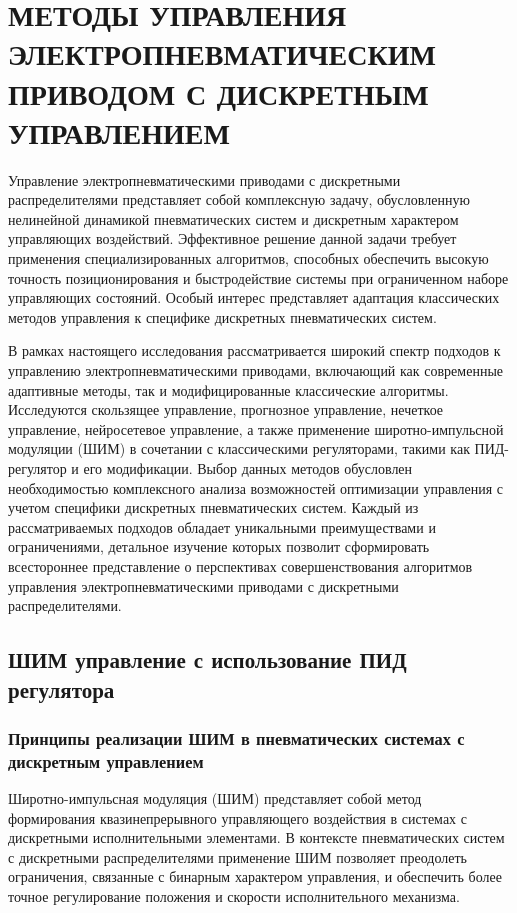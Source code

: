 \chapter{МЕТОДЫ УПРАВЛЕНИЯ ЭЛЕКТРОПНЕВМАТИЧЕСКИМ ПРИВОДОМ С ДИСКРЕТНЫМ УПРАВЛЕНИЕМ}\label{ch:ch3}
Управление электропневматическими приводами с дискретными распределителями представляет
собой комплексную задачу, обусловленную нелинейной динамикой пневматических систем и
дискретным характером управляющих воздействий. Эффективное решение данной задачи требует
применения специализированных алгоритмов, способных обеспечить высокую точность позиционирования и
быстродействие системы при ограниченном наборе управляющих состояний. Особый интерес представляет адаптация
классических методов управления к специфике дискретных пневматических систем.

В рамках настоящего исследования рассматривается широкий спектр подходов к управлению электропневматическими
приводами, включающий как современные адаптивные методы, так и модифицированные
классические алгоритмы. Исследуются скользящее управление, прогнозное управление,
нечеткое управление, нейросетевое управление, а также применение широтно-импульсной модуляции (ШИМ)
в сочетании с классическими регуляторами, такими как ПИД-регулятор и его модификации.
Выбор данных методов обусловлен необходимостью комплексного анализа возможностей оптимизации управления
с учетом специфики дискретных пневматических систем. Каждый из рассматриваемых подходов обладает
уникальными преимуществами и ограничениями, детальное изучение которых позволит сформировать
всестороннее представление о перспективах совершенствования алгоритмов управления
электропневматическими приводами с дискретными распределителями.

\section{ШИМ управление с использование ПИД регулятора}\label{sec:ch3/sec1}

\subsection{Принципы реализации ШИМ в пневматических системах с дискретным управлением}\label{subsec:ch3/sec1/sub1}
Широтно-импульсная модуляция (ШИМ) представляет собой метод формирования квазинепрерывного
управляющего воздействия в системах с дискретными исполнительными элементами.
В контексте пневматических систем с дискретными распределителями применение ШИМ
позволяет преодолеть ограничения, связанные с бинарным характером управления, и обеспечить более
точное регулирование положения и скорости исполнительного механизма.

